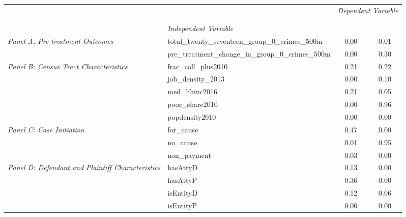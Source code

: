 \begin{tabular}{llcc}
\toprule
 &  & \multicolumn{2}{c}{\textit{Dependent Variable}} \\
\cline{3-4}
\\
 &  &  &  \\
 & \emph{Independent Variable} &  &  \\
\midrule
\multirow[c]{2}{3cm}{\textit{Panel A: Pre-treatment Outcomes}} & total_twenty_seventeen_group_0_crimes_500m & 0.00 & 0.01 \\
 & pre_treatment_change_in_group_0_crimes_500m & 0.00 & 0.30 \\
\cline{1-4}
\multirow[c]{5}{3cm}{\textit{Panel B: Census Tract Characteristics}} & frac_coll_plus2010 & 0.21 & 0.22 \\
 & job_density_2013 & 0.00 & 0.10 \\
 & med_hhinc2016 & 0.21 & 0.05 \\
 & poor_share2010 & 0.00 & 0.96 \\
 & popdensity2010 & 0.00 & 0.00 \\
\cline{1-4}
\multirow[c]{3}{3cm}{\textit{Panel C: Case Initiation}} & for_cause & 0.47 & 0.00 \\
 & no_cause & 0.01 & 0.95 \\
 & non_payment & 0.03 & 0.00 \\
\cline{1-4}
\multirow[c]{4}{3cm}{\textit{Panel D: Defendant and Plaintiff Characteristics}} & hasAttyD & 0.13 & 0.00 \\
 & hasAttyP & 0.36 & 0.00 \\
 & isEntityD & 0.12 & 0.06 \\
 & isEntityP & 0.00 & 0.00 \\
\cline{1-4}
\bottomrule
\end{tabular}
